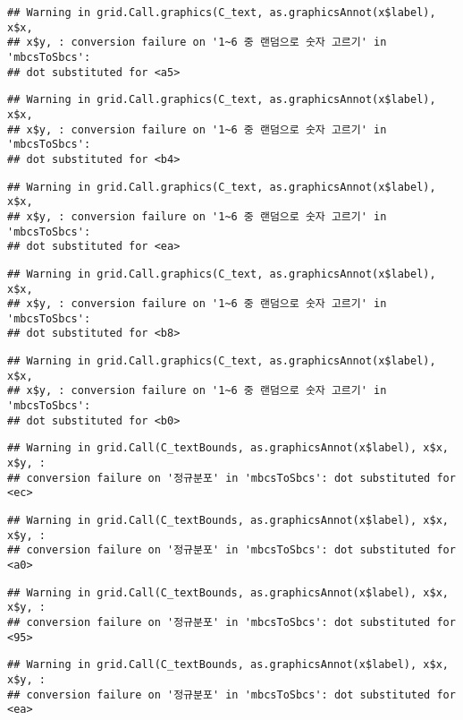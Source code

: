 \documentclass[]{book}
\begin{document}
\begin{verbatim}
## Warning in grid.Call.graphics(C_text, as.graphicsAnnot(x$label), x$x,
## x$y, : conversion failure on '1~6 중 랜덤으로 숫자 고르기' in 'mbcsToSbcs':
## dot substituted for <a5>
\end{verbatim}

\begin{verbatim}
## Warning in grid.Call.graphics(C_text, as.graphicsAnnot(x$label), x$x,
## x$y, : conversion failure on '1~6 중 랜덤으로 숫자 고르기' in 'mbcsToSbcs':
## dot substituted for <b4>
\end{verbatim}

\begin{verbatim}
## Warning in grid.Call.graphics(C_text, as.graphicsAnnot(x$label), x$x,
## x$y, : conversion failure on '1~6 중 랜덤으로 숫자 고르기' in 'mbcsToSbcs':
## dot substituted for <ea>
\end{verbatim}

\begin{verbatim}
## Warning in grid.Call.graphics(C_text, as.graphicsAnnot(x$label), x$x,
## x$y, : conversion failure on '1~6 중 랜덤으로 숫자 고르기' in 'mbcsToSbcs':
## dot substituted for <b8>
\end{verbatim}

\begin{verbatim}
## Warning in grid.Call.graphics(C_text, as.graphicsAnnot(x$label), x$x,
## x$y, : conversion failure on '1~6 중 랜덤으로 숫자 고르기' in 'mbcsToSbcs':
## dot substituted for <b0>
\end{verbatim}

\begin{verbatim}
## Warning in grid.Call(C_textBounds, as.graphicsAnnot(x$label), x$x, x$y, :
## conversion failure on '정규분포' in 'mbcsToSbcs': dot substituted for <ec>
\end{verbatim}

\begin{verbatim}
## Warning in grid.Call(C_textBounds, as.graphicsAnnot(x$label), x$x, x$y, :
## conversion failure on '정규분포' in 'mbcsToSbcs': dot substituted for <a0>
\end{verbatim}

\begin{verbatim}
## Warning in grid.Call(C_textBounds, as.graphicsAnnot(x$label), x$x, x$y, :
## conversion failure on '정규분포' in 'mbcsToSbcs': dot substituted for <95>
\end{verbatim}

\begin{verbatim}
## Warning in grid.Call(C_textBounds, as.graphicsAnnot(x$label), x$x, x$y, :
## conversion failure on '정규분포' in 'mbcsToSbcs': dot substituted for <ea>
\end{verbatim}
\end{document}
